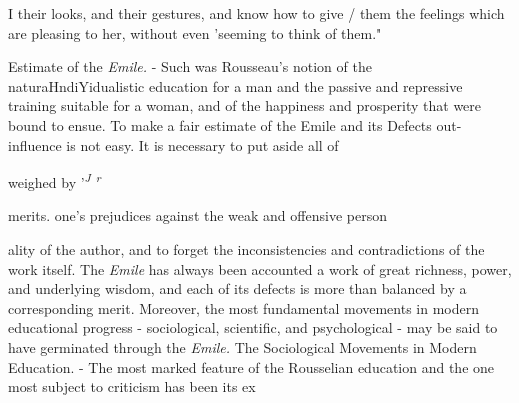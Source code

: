 \documentclass[
]{book}
\begin{document}
I their looks, and their gestures, and know how to give / them the feelings which are pleasing to her, without even 'seeming to think of them."

Estimate of the \emph{Emile.} - Such was Rousseau's notion of the naturaHndiYidualistic education for a man and the passive and repressive training suitable for a woman, and of the happiness and prosperity that were bound to ensue. To make a fair estimate of the Emile and its Defects out- influence is not easy. It is necessary to put aside all of

weighed by '\emph{\textsuperscript{J} \textsuperscript{r}}

merits. one's prejudices against the weak and offensive person

ality of the author, and to forget the inconsistencies and contradictions of the work itself. The \emph{Emile} has always been accounted a work of great richness, power, and underlying wisdom, and each of its defects is more than balanced by a corresponding merit. Moreover, the most fundamental movements in modern educational progress - sociological, scientific, and psychological - may be said to have germinated through the \emph{Emile.} The Sociological Movements in Modern Education. - The most marked feature of the Rousselian education and the one most subject to criticism has been its ex
\end{document}
